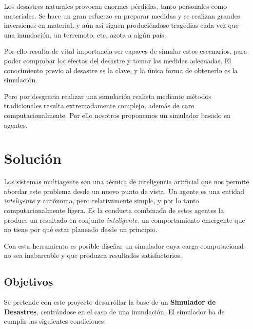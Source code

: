 Los desastres naturales provocan enormes pérdidas, tanto personales como
materiales. Se hace un gran esfuerzo en preparar medidas y se realizan grandes
inversiones en material, y aún así siguen produciéndose tragedias cada vez que
una inundación, un terremoto, etc, azota a algún país\cite{Cho07}.

Por ello resulta de vital importancia ser capaces de simular estos escenarios,
para poder comprobar los efectos del desastre y tomar las medidas adecuadas. El
conocimiento previo al desastre es la clave, y la única forma de obtenerlo es
la simulación.

Pero por desgracia realizar una simulación realista mediante métodos
tradicionales resulta extremadamente complejo, además de caro
computacionalmente. Por ello nosotros proponemos un simulador basado en agentes.

\section*{Solución}

Los sistemas multiagente son una técnica de inteligencia artificial que nos
permite abordar este problema desde un nuevo punto de vista. Un agente es una
entidad {\em inteligente} y autónoma, pero relativamente simple, y por lo tanto
computacionalmente ligera. Es la conducta combinada de estos agentes la produce
un resultado en conjunto {\em inteligente}, un comportamiento emergente que no
tiene por qué estar planeado desde un principio.

Con esta herramienta es posible diseñar un simulador cuya carga computacional
no sea inabarcable y que produzca resultados satisfactorios.

\subsection*{Objetivos}

Se pretende con este proyecto desarrollar la base de un {\bf Simulador de
Desastres}, centrándose en el caso de una inundación. El simulador ha de cumplir
las siguientes condiciones:

